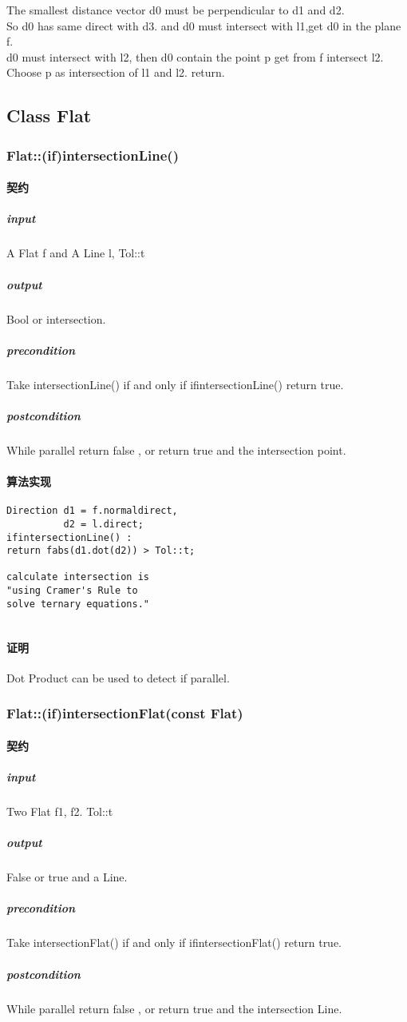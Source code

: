 \documentclass[a4paper]{book}
\numberwithin{equation}{chapter}
\theoremstyle{definition}
\begin{document}
\begin{multicols}{2}
The smallest distance vector d0 must be perpendicular to d1 and d2. \\

So d0 has same direct with d3.
and d0 must intersect with l1,get d0 in the plane f. \\

d0 must intersect with l2, then d0 contain the point p get from f intersect l2. \\

Choose p as intersection of l1 and l2. return.


\subsection{Class Flat}

\subsubsection{Flat::(if)intersectionLine()}
\paragraph{契约}
\subparagraph{input}
A Flat f and A Line l, Tol::t
\subparagraph{output}
Bool or intersection.
\subparagraph{precondition}
Take intersectionLine() if and only if ifintersectionLine() return true.
\subparagraph{postcondition}
While parallel return false , or return true and the intersection point.
\paragraph{算法实现}
\begin{lstlisting}
Direction d1 = f.normaldirect,
          d2 = l.direct;
ifintersectionLine() : 
return fabs(d1.dot(d2)) > Tol::t;

calculate intersection is 
"using Cramer's Rule to 
solve ternary equations."


\end{lstlisting}
\paragraph{证明}
Dot Product can be used to detect if parallel.


\subsubsection{Flat::(if)intersectionFlat(const Flat)}
\paragraph{契约}
\subparagraph{input}
Two Flat f1, f2. Tol::t
\subparagraph{output}
False or true and a Line. 
\subparagraph{precondition}
Take intersectionFlat() if and only if ifintersectionFlat() return true.
\subparagraph{postcondition}
While parallel return false , or return true and the intersection Line.

\end{multicols}
\end{document}
